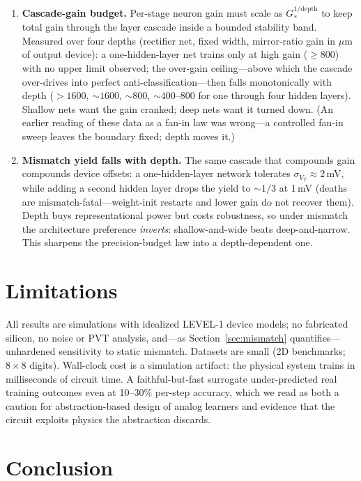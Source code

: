 \documentclass[11pt]{article}
\begin{document}
\begin{enumerate}
\item \textbf{Cascade-gain budget.} Per-stage neuron gain must scale as $G_*^{1/\text{depth}}$ to keep total gain through the layer cascade inside a bounded stability band. Measured over four depths (rectifier net, fixed width, mirror-ratio gain in $\mu$m of output device): a one-hidden-layer net trains only at high gain ($\ge 800$) with no upper limit observed; the over-gain ceiling---above which the cascade over-drives into perfect anti-classification---then falls monotonically with depth ($>1600$, ${\sim}1600$, ${\sim}800$, ${\sim}400$--$800$ for one through four hidden layers). Shallow nets want the gain cranked; deep nets want it turned down. (An earlier reading of these data as a fan-in law was wrong---a controlled fan-in sweep leaves the boundary fixed; depth moves it.)
\item \textbf{Mismatch yield falls with depth.} The same cascade that compounds gain compounds device offsets: a one-hidden-layer network tolerates $\sigma_{V_T}\approx 2$\,mV, while adding a second hidden layer drops the yield to ${\sim}1/3$ at $1$\,mV (deaths are mismatch-fatal---weight-init restarts and lower gain do not recover them). Depth buys representational power but costs robustness, so under mismatch the architecture preference \emph{inverts}: shallow-and-wide beats deep-and-narrow. This sharpens the precision-budget law into a depth-dependent one.
\end{enumerate}

\section{Limitations}
\label{sec:limits}

All results are simulations with idealized LEVEL-1 device models; no fabricated silicon, no noise or PVT analysis, and---as Section~\ref{sec:mismatch} quantifies---unhardened sensitivity to static mismatch. Datasets are small (2D benchmarks; $8{\times}8$ digits). Wall-clock cost is a simulation artifact: the physical system trains in milliseconds of circuit time. A faithful-but-fast surrogate under-predicted real training outcomes even at 10--30\% per-step accuracy, which we read as both a caution for abstraction-based design of analog learners and evidence that the circuit exploits physics the abstraction discards.

\section{Conclusion}
\end{document}

